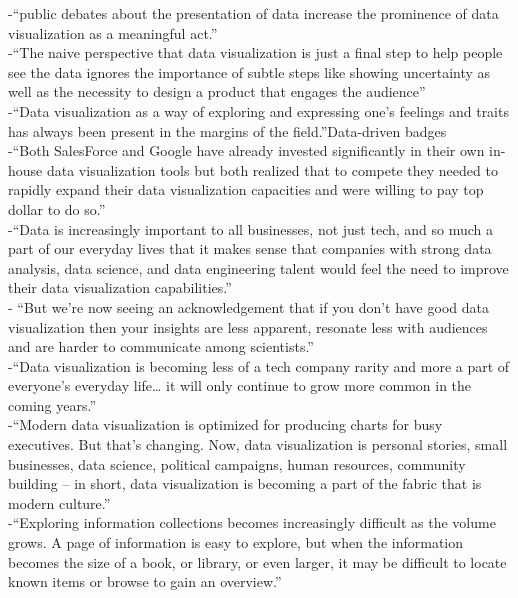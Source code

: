 -{\color{orange}“public debates about the presentation of data increase the prominence of data visualization as a meaningful act.” \cite{Meeks2019}}\\
-{\color{orange}“The naive perspective that data visualization is just a final step to help people see the data ignores the importance of subtle steps like showing uncertainty as well as the necessity to design a product that engages the audience”}\\
-{\color{orange}“Data visualization as a way of exploring and expressing one’s feelings and traits has always been present in the margins of the field.”\cite{Meeks2019}}{\color{red}Data-driven badges\cite{Meeks2019}}\\
-{\color{orange}“Both SalesForce and Google have already invested significantly in their own in-house data visualization tools but both realized that to compete they needed to rapidly expand their data visualization capacities and were willing to pay top dollar to do so.”\cite{Meeks2019}}\\
-{\color{orange}“Data is increasingly important to all businesses, not just tech, and so much a part of our everyday lives that it makes sense that companies with strong data analysis, data science, and data engineering talent would feel the need to improve their data visualization capabilities.” \cite{Meeks2019}}\\
-{\color{orange}  “But we’re now seeing an acknowledgement that if you don’t have good data visualization then your insights are less apparent, resonate less with audiences and are harder to communicate among scientists.”\cite{Meeks2019}}\\
-{\color{orange}“Data visualization is becoming less of a tech company rarity and more a part of everyone’s everyday life… it will only continue to grow more common in the coming years.” \cite{Meeks2019}}\\
-{\color{orange}“Modern data visualization is optimized for producing charts for busy executives. But that’s changing. Now, data visualization is personal stories, small businesses, data science, political campaigns, human resources, community building -- in short, data visualization is becoming a part of the fabric that is modern culture.”\cite{Meeks2019}}\\
-{\color{orange}“Exploring information collections becomes increasingly difficult as the volume grows. A page of information is easy to explore, but when the information becomes the size of a book, or library, or even larger, it may be difficult to locate known items or browse to gain an overview.”\cite{Shneiderman1996}}\\
